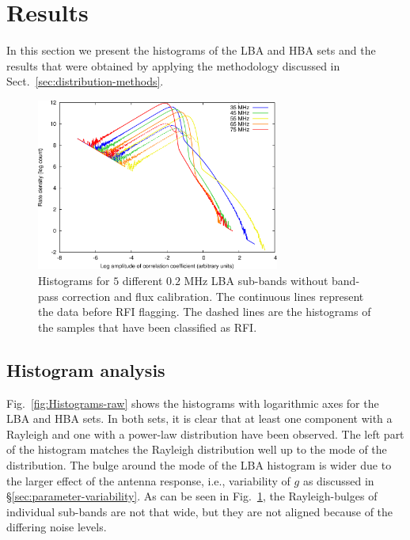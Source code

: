 \documentclass[useAMS,usenatbib]{mn2e}
\begin{document}
\section{Results} \label{sec:dist-results}
In this section we present the histograms of the LBA and HBA sets and the results that were obtained by applying the methodology discussed in Sect.~\ref{sec:distribution-methods}. 

\begin{figure}
\begin{center}
\includegraphics[width=8cm]{img/plot-lba-dist-per-frequency-trimmed}
\caption{Histograms for $5$ different $0.2$ MHz LBA sub-bands without band-pass correction and flux calibration. The continuous lines represent the data before RFI flagging. The dashed lines are the histograms of the samples that have been classified as RFI.}
\label{fig:plot-dist-per-frequency-LBA}
\end{center}
\end{figure}

\subsection{Histogram analysis}
Fig.~\ref{fig:Histograms-raw} shows the histograms with logarithmic axes for the LBA and HBA sets. In both sets, it is clear that at least one component with a Rayleigh and one with a power-law distribution have been observed. The left part of the histogram matches the Rayleigh distribution well up to the mode of the distribution. The bulge around the mode of the LBA histogram is wider due to the larger effect of the antenna response, i.e., variability of $g$ as discussed in \S\ref{sec:parameter-variability}. As can be seen in Fig.~\ref{fig:plot-dist-per-frequency-LBA}, the Rayleigh-bulges of individual sub-bands are not that wide, but they are not aligned because of the differing noise levels. %
\end{document}

